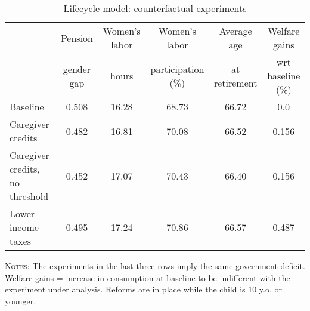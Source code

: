 \begin{table}[htbp]\begin{threeparttable}\caption{Lifecycle model: counterfactual experiments}\label{table:experiments}\centering\footnotesize\begin{tabular}{lccccc} \toprule & Pension & Women's labor & Women's labor & Average age &  Welfare gains  \\&gender gap &hours &  participation  (\%) & at retirement  & wrt baseline (\%)  \\\midrule    Baseline                                   &0.508&16.28&68.73&66.72& 0.0\\ Caregiver credits                          &0.482&16.81&70.08&66.52&0.156\\ Caregiver credits, no threshold            &0.452&17.07&70.43&66.40&0.156\\ Lower income taxes                         &0.495&17.24&70.86&66.57&0.487\\ \bottomrule\end{tabular}\begin{tablenotes}[flushleft]\small\item \textsc{Notes:} The experiments in the last three rows imply the same government deficit. Welfare gains = increase in consumption at baseline to be indifferent with the experiment under analysis. Reforms are in place while the child is 10 y.o. or younger.\\\end{tablenotes}\end{threeparttable}\end{table}